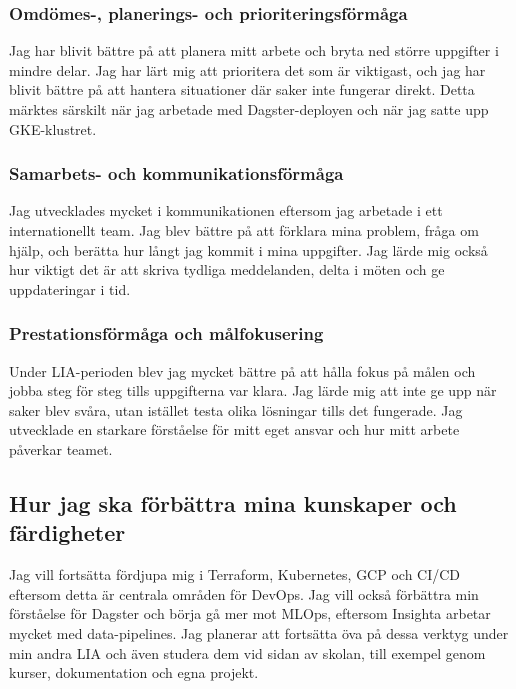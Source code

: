 \subsubsection{Omdömes-, planerings- och prioriteringsförmåga}
\label{subsubsec:omdome_utveckling}
Jag har blivit bättre på att planera mitt arbete och bryta ned större uppgifter i mindre delar. Jag har lärt mig att prioritera det som är viktigast, och jag har blivit bättre på att hantera situationer där saker inte fungerar direkt. Detta märktes särskilt när jag arbetade med Dagster-deployen och när jag satte upp GKE-klustret.


\subsubsection{Samarbets- och kommunikationsförmåga}
\label{subsubsec:samarbete_utveckling}

Jag utvecklades mycket i kommunikationen eftersom jag arbetade i ett internationellt team. Jag blev bättre på att förklara mina problem, fråga om hjälp, och berätta hur långt jag kommit i mina uppgifter. Jag lärde mig också hur viktigt det är att skriva tydliga meddelanden, delta i möten och ge uppdateringar i tid.


\subsubsection{Prestationsförmåga och målfokusering}
\label{subsubsec:prestation_utveckling}

Under LIA-perioden blev jag mycket bättre på att hålla fokus på målen och jobba steg för steg tills uppgifterna var klara. Jag lärde mig att inte ge upp när saker blev svåra, utan istället testa olika lösningar tills det fungerade. Jag utvecklade en starkare förståelse för mitt eget ansvar och hur mitt arbete påverkar teamet.


\subsection{Hur jag ska förbättra mina kunskaper och färdigheter}
\label{subsec:forbattring}
Jag vill fortsätta fördjupa mig i Terraform, Kubernetes, GCP och CI/CD eftersom detta är centrala områden för DevOps. Jag vill också förbättra min förståelse för Dagster och börja gå mer mot MLOps, eftersom Insighta arbetar mycket med data-pipelines. Jag planerar att fortsätta öva på dessa verktyg under min andra LIA och även studera dem vid sidan av skolan, till exempel genom kurser, dokumentation och egna projekt.